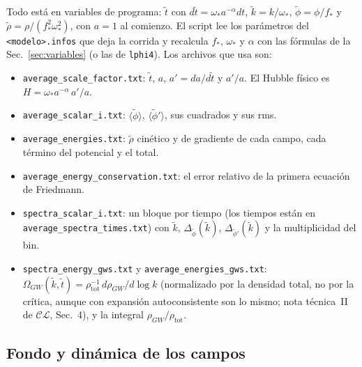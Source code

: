 \documentclass[11pt]{article}
\newcommand{\CosmoLattice}{\ensuremath{\mathcal{C}}\text{osmo}\ensuremath{\mathcal{L}}\text{attice}\xspace}
\begin{document}
            Todo está en variables de programa: $\tilde t$ con $d\tilde t = \omega_* a^{-\alpha} dt$, $\tilde k = k/\omega_*$, $\tilde\phi = \phi/f_*$ y $\tilde\rho = \rho/(f_*^2\omega_*^2)$, con $a = 1$ al comienzo. El script lee los parámetros del \texttt{<modelo>.infos} que deja la corrida y recalcula $f_*$, $\omega_*$ y $\alpha$ con las fórmulas de la Sec.~\ref{sec:variables} (o las de \texttt{lphi4}). Los archivos que usa son:
            \begin{itemize}
                \item \texttt{average\_scale\_factor.txt}: $\tilde t$, $a$, $a' = da/d\tilde t$ y $a'/a$. El Hubble físico es $H = \omega_* a^{-\alpha} \, a'/a$.
                \item \texttt{average\_scalar\_i.txt}: $\langle\tilde\phi\rangle$, $\langle\tilde\phi'\rangle$, sus cuadrados y sus rms.
                \item \texttt{average\_energies.txt}: $\tilde\rho$ cinético y de gradiente de cada campo, cada término del potencial y el total.
                \item \texttt{average\_energy\_conservation.txt}: el error relativo de la primera ecuación de Friedmann.
                \item \texttt{spectra\_scalar\_i.txt}: un bloque por tiempo (los tiempos están en \texttt{average\_spectra\_times.txt}) con $\tilde k$, $\Delta_{\tilde\phi}(\tilde k)$, $\Delta_{\tilde\phi'}(\tilde k)$ y la multiplicidad del bin.
                \item \texttt{spectra\_energy\_gws.txt} y \texttt{average\_energies\_gws.txt}: $\Omega_{GW}(\tilde k, \tilde t) = \rho_{\text{tot}}^{-1} \, d\rho_{GW}/d\log k$ (normalizado por la densidad total, no por la crítica, aunque con expansión autoconsistente son lo mismo; nota técnica~II de \CosmoLattice, Sec.~4), y la integral $\rho_{GW}/\rho_{\text{tot}}$.
            \end{itemize}

        \subsection{Fondo y dinámica de los campos}
\end{document}
